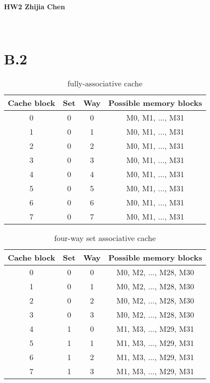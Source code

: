 \documentclass{article}
\begin{document}
\paragraph{HW2 Zhijia Chen}\text{ }\\
\section{B.2}
\begin{table}[h!]
  \begin{center}
    \caption{fully-associative cache}
    \label{tab:table1}
    \begin{tabular}{c|c|c|c} %
      \toprule
      \textbf{Cache block} & \textbf{Set} & \textbf{Way} & \textbf{Possible memory blocks}\\
      \hline
      0 & 0 & 0 & M0, M1, ..., M31\\
      \hline
      1 & 0 & 1 & M0, M1, ..., M31\\
      \hline
      2 & 0 & 2 & M0, M1, ..., M31\\
      \hline
      3 & 0 & 3 & M0, M1, ..., M31\\
      \hline
      4 & 0 & 4 & M0, M1, ..., M31\\
      \hline
      5 & 0 & 5 & M0, M1, ..., M31\\
      \hline
      6 & 0 & 6 & M0, M1, ..., M31\\
      \hline
      7 & 0 & 7 & M0, M1, ..., M31\\
      \bottomrule
    \end{tabular}
  \end{center}
\end{table}
\begin{table}[h!]
  \begin{center}
    \caption{four-way set associative cache}
    \label{tab:table2}
    \begin{tabular}{c|c|c|c} %
      \toprule
      \textbf{Cache block} & \textbf{Set} & \textbf{Way} & \textbf{Possible memory blocks}\\
      \hline
      0 & 0 & 0 & M0, M2, ..., M28, M30\\
      \hline
      1 & 0 & 1 & M0, M2, ..., M28, M30\\
      \hline
      2 & 0 & 2 & M0, M2, ..., M28, M30\\
      \hline
      3 & 0 & 3 & M0, M2, ..., M28, M30\\
      \hline
      4 & 1 & 0 & M1, M3, ..., M29, M31\\
      \hline
      5 & 1 & 1 & M1, M3, ..., M29, M31\\
      \hline
      6 & 1 & 2 & M1, M3, ..., M29, M31\\
      \hline
      7 & 1 & 3 & M1, M3, ..., M29, M31\\
      \bottomrule
    \end{tabular}
  \end{center}
\end{table}
\end{document}
